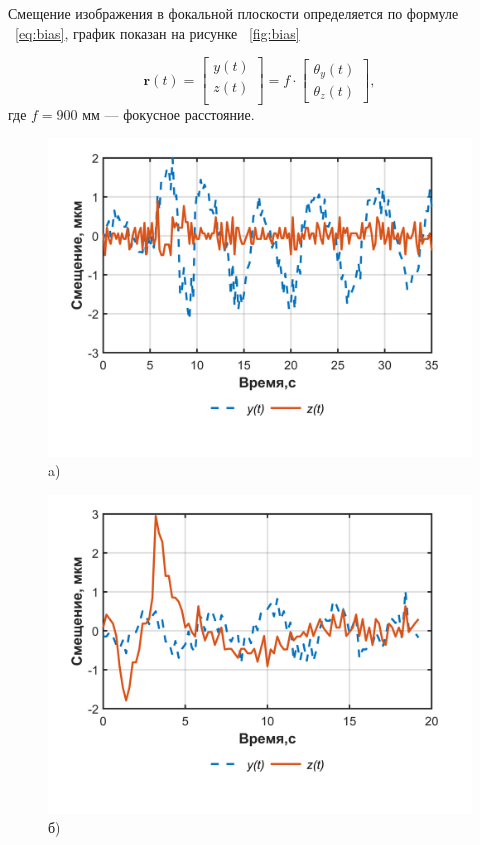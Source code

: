 \pagebreak
 	Смещение изображения в фокальной плоскости определяется по формуле ~\eqref{eq:bias}, график показан на рисунке ~\ref{fig:bias}
 	
 	\begin{equation}
 		\label{eq:bias}
 		\mathbf{r}(t) = 
 		\begin{bmatrix}
 			y(t) \\
 			z(t) \\
 		\end{bmatrix}
 		= f \cdot
 		\begin{bmatrix}
 			\theta_{y}(t) \\
 			\theta_{z}(t)
 		\end{bmatrix},
 	\end{equation}
где \(f=900\) мм --- фокусное расстояние.

 \begin{figure}[h!]
 	\begin{minipage}[b][][b]{0.49\linewidth}\centering
 		\includegraphics[width=1\linewidth]{matlab/img/biasY.png} \\ a)
 	\end{minipage}
 	\hfill
 	\begin{minipage}[b][][b]{0.49\linewidth}\centering
 		\includegraphics[width=1\linewidth]{matlab/img/biasZ.png} \\ б)

\end{minipage}
\end{figure}
